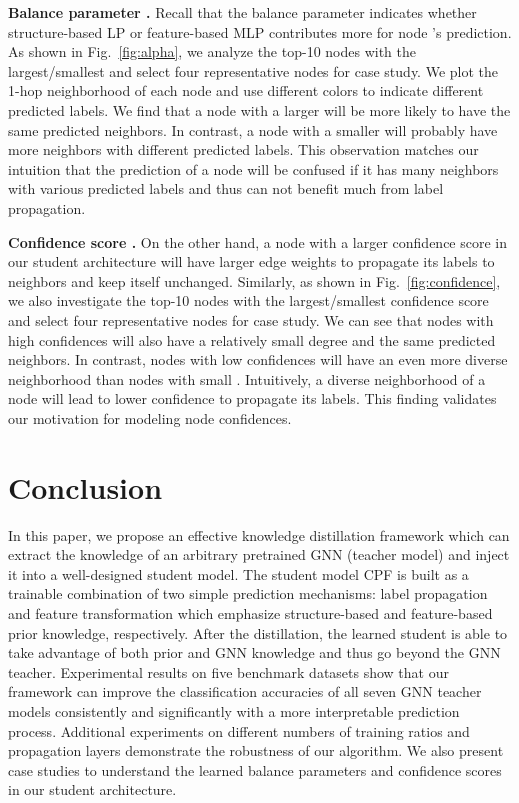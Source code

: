 \documentclass[sigconf]{acmart}
\begin{document}
\textbf{Balance parameter .} Recall that the balance parameter  indicates whether structure-based LP or feature-based MLP contributes more for node 's prediction. As shown in Fig.~\ref{fig:alpha}, we analyze the top-10 nodes with the largest/smallest  and select four representative nodes for case study. We plot the 1-hop neighborhood of each node and use different colors to indicate different predicted labels. We find that a node with a larger  will be more likely to have the same predicted neighbors. In contrast, a node with a smaller  will probably have more neighbors with different predicted labels. This observation matches our intuition that the prediction of a node will be confused if it has many neighbors with various predicted labels and thus can not benefit much from label propagation.

\textbf{Confidence score .} On the other hand, a node with a larger confidence score  in our student architecture will have larger edge weights to propagate its labels to neighbors and keep itself unchanged. Similarly, as shown in Fig.~\ref{fig:confidence}, we also investigate the top-10 nodes with the largest/smallest confidence score  and select four representative nodes for case study. We can see that nodes with high confidences will also have a relatively small degree and the same predicted neighbors. In contrast, nodes with low confidences  will have an even more diverse neighborhood than nodes with small . Intuitively, a diverse neighborhood of a node will lead to lower confidence to propagate its labels. This finding validates our motivation for modeling node confidences.


\section{Conclusion}
In this paper, we propose an effective knowledge distillation framework which can extract the knowledge of an arbitrary pretrained GNN (teacher model) and inject it into a well-designed student model. The student model CPF is built as a trainable combination of two simple prediction mechanisms: label propagation and feature transformation which emphasize structure-based and feature-based prior knowledge, respectively. After the distillation, the learned student is able to take advantage of both prior and GNN knowledge and thus go beyond the GNN teacher. Experimental results on five benchmark datasets show that our framework can improve the classification accuracies of all seven GNN teacher models consistently and significantly with a more interpretable prediction process. Additional experiments on different numbers of training ratios and propagation layers demonstrate the robustness of our algorithm. We also present case studies to understand the learned balance parameters and confidence scores in our student architecture.
\end{document}
